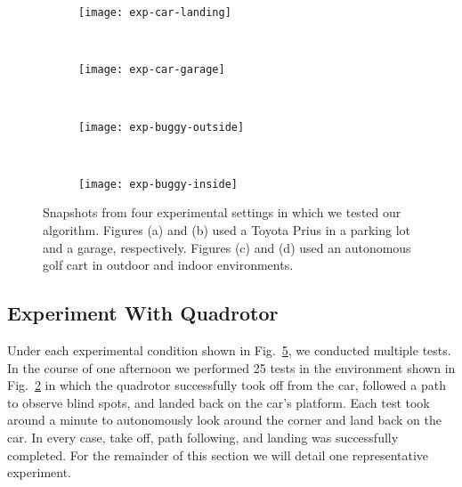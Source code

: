 \begin{figure}[t!]

    \centering

    \begin{subfigure}[t]{0.4\textwidth}

        \centering
        \texttt{[image: exp-car-landing]}
        \caption{}

        \label{fig:exp-car-landing}

    \end{subfigure}
    ~
    \begin{subfigure}[t]{0.4\textwidth}

        \centering
        \texttt{[image: exp-car-garage]}
        \caption{}

        \label{fig:exp-car-garage}

    \end{subfigure}
    ~
    \begin{subfigure}[t]{0.4\textwidth}

        \centering
        \texttt{[image: exp-buggy-outside]}
        \caption{}

        \label{fig:exp-buggy-outside}

    \end{subfigure}
    ~
    \begin{subfigure}[t]{0.4\textwidth}

        \centering
        \texttt{[image: exp-buggy-inside]}
        \caption{}

        \label{fig:exp-buggy-inside}

    \end{subfigure}

    \caption{Snapshots from four experimental settings in which we tested our
    algorithm. Figures (a) and (b) used a Toyota Prius in a parking lot and a garage, respectively. Figures (c) and (d) used an autonomous golf cart in outdoor and indoor environments.}

    \label{fig:exps}

\end{figure}

\subsection{Experiment With Quadrotor}

Under each experimental condition shown in Fig.~\ref{fig:exps}, we conducted
multiple tests. In the course of one afternoon we performed 25 tests in the
environment shown in Fig.~\ref{fig:exp-car-garage} in which the quadrotor
successfully took off from the car, followed a path to observe blind spots, and
landed back on the car's platform. Each test took around a minute to
autonomously look around the corner and land back on the car. In every case,
take off, path following, and landing was successfully completed.  For the
remainder of this section we will detail one representative experiment.

